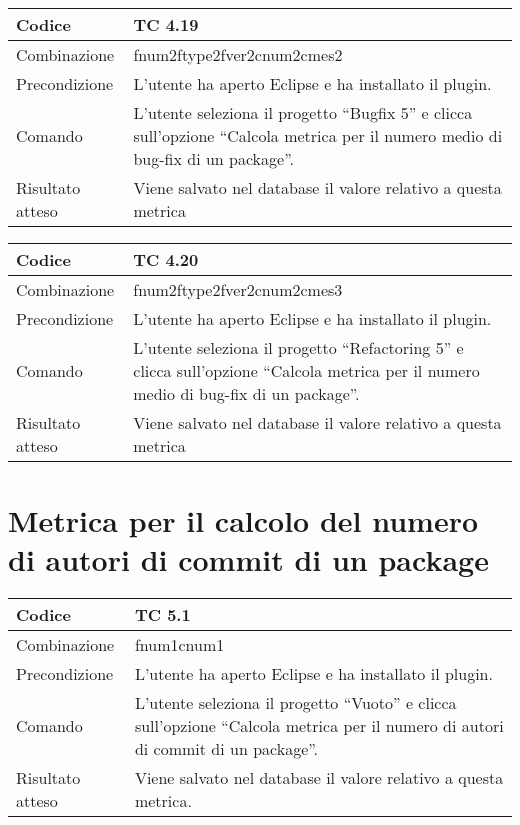\begin{table}[ht]
\begin{tabular}{|p{3cm}|p{9cm}|}
\hline
\cellcolor{lightgray}Codice				& TC 4.19								\\
\hline
\cellcolor{lightgray}Combinazione		& fnum2ftype2fver2cnum2cmes2 									\\
\hline
\cellcolor{lightgray}Precondizione		& L'utente ha aperto Eclipse e ha installato il plugin.								\\
\hline
\cellcolor{lightgray}Comando			& L'utente seleziona il progetto ``Bugfix 5''  e clicca sull'opzione ``Calcola metrica per il numero medio di bug-fix di un package''.	\\
\hline
\cellcolor{lightgray}Risultato atteso	& Viene salvato nel database il valore relativo a questa metrica	\\
\hline
\end{tabular}
\end{table}

\begin{table}[ht]
\begin{tabular}{|p{3cm}|p{9cm}|}
\hline
\cellcolor{lightgray}Codice				& TC 4.20								\\
\hline
\cellcolor{lightgray}Combinazione		& fnum2ftype2fver2cnum2cmes3 									\\
\hline
\cellcolor{lightgray}Precondizione		& L'utente ha aperto Eclipse e ha installato il plugin.									\\
\hline
\cellcolor{lightgray}Comando			& L'utente seleziona il progetto ``Refactoring 5''  e clicca sull'opzione ``Calcola metrica per il numero medio di bug-fix di un package''.	\\
\hline
\cellcolor{lightgray}Risultato atteso	& Viene salvato nel database il valore relativo a questa metrica	\\
\hline
\end{tabular}
\end{table}
\clearpage

\section{Metrica per il calcolo del numero di autori di commit di un package}

\begin{table}[ht]
\begin{tabular}{|p{3cm}|p{9cm}|}
\hline
\cellcolor{lightgray}Codice				& TC 5.1								\\
\hline
\cellcolor{lightgray}Combinazione		& fnum1cnum1									\\
\hline
\cellcolor{lightgray}Precondizione		& L'utente ha aperto Eclipse e ha installato il plugin.		\\
\hline
\cellcolor{lightgray}Comando			& L'utente seleziona il progetto ``Vuoto''  e clicca sull'opzione ``Calcola metrica per il numero di autori di commit di un package''.	\\
\hline
\cellcolor{lightgray}Risultato atteso	& Viene salvato nel database il valore relativo a questa metrica.\\
\hline
\end{tabular}
\end{table}

